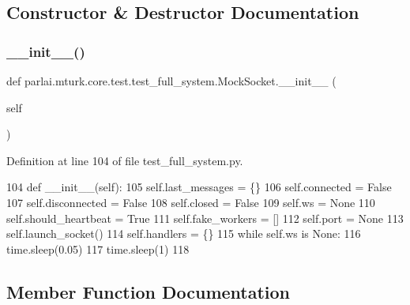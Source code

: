 \subsection{Constructor \& Destructor Documentation}
\mbox{\label{classparlai_1_1mturk_1_1core_1_1test_1_1test__full__system_1_1MockSocket_a2f3062cf26828b0b213e4ddaf0ebbde5}} 
\subsubsection{\texorpdfstring{\+\_\+\+\_\+init\+\_\+\+\_\+()}{\_\_init\_\_()}}
{\footnotesize\ttfamily def parlai.\+mturk.\+core.\+test.\+test\+\_\+full\+\_\+system.\+Mock\+Socket.\+\_\+\+\_\+init\+\_\+\+\_\+ (\begin{DoxyParamCaption}\item[{}]{self }\end{DoxyParamCaption})}



Definition at line 104 of file test\+\_\+full\+\_\+system.\+py.


\begin{DoxyCode}
104     \textcolor{keyword}{def }\_\_init\_\_(self):
105         self.last\_messages = \{\}
106         self.connected = \textcolor{keyword}{False}
107         self.disconnected = \textcolor{keyword}{False}
108         self.closed = \textcolor{keyword}{False}
109         self.ws = \textcolor{keywordtype}{None}
110         self.should\_heartbeat = \textcolor{keyword}{True}
111         self.fake\_workers = []
112         self.port = \textcolor{keywordtype}{None}
113         self.launch\_socket()
114         self.handlers = \{\}
115         \textcolor{keywordflow}{while} self.ws \textcolor{keywordflow}{is} \textcolor{keywordtype}{None}:
116             time.sleep(0.05)
117         time.sleep(1)
118 
\end{DoxyCode}


\subsection{Member Function Documentation}
\mbox{\label{classparlai_1_1mturk_1_1core_1_1test_1_1test__full__system_1_1MockSocket_ad8f95da992b7df7b8c823bd98d014491}} 
